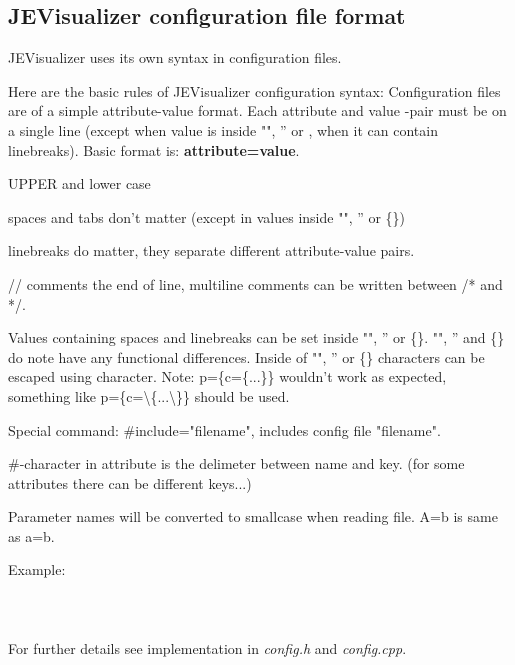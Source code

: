\documentclass{article}
\begin{document}
    
    \subsection{JEVisualizer configuration file format}
      JEVisualizer uses its own syntax in configuration files.
      
      Here are the basic rules of JEVisualizer configuration syntax:
      Configuration files are of a simple attribute-value format. Each attribute and value -pair must be on a single line (except when
      value is inside "", '' or {}, when it can contain linebreaks). Basic format is: \textbf{attribute=value}.
      
      \begin{labeling}{UPPER and lower case}
        \item [spaces and tabs]       spaces and tabs don't matter (except in values inside "", '' or \{\})
        \item [linebreaks]            linebreaks do matter, they separate different attribute-value pairs.
        \item [commenting]            // comments the end of line, multiline comments can be written between /* and */.
        \item ["", '' and {}]         Values containing spaces and linebreaks can be set inside "", '' or \{\}. "", '' and \{\} do note
                                      have any functional differences. Inside of "", '' or \{\} characters can be escaped using \-character.
                                      Note: p=\{c=\{...\}\} wouldn't work as expected, something like p=\{c=\textbackslash\{...\textbackslash\}\} should be used.
        \item [including other files] Special command: \#include="filename", includes config file "filename".
        \item [\#-character]          \#-character in attribute is the delimeter between name and key. (for some attributes there can
                                      be different keys...)
        \item [UPPER and lower case]  Parameter names will be converted to smallcase when reading file. A=b is same as a=b.
      \end{labeling}
      Example: \\ \\
       \\ \\
      For further details see implementation in \textit{config.h} and \textit{config.cpp}.
      
\end{document}
